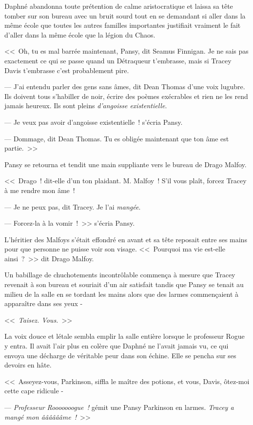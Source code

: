 Daphné abandonna toute prétention de calme aristocratique et laissa sa tête tomber sur son bureau avec un bruit sourd tout en se demandant si aller dans la même école que toutes les autres familles importantes justifiait vraiment le fait d'aller dans la même école que la légion du Chaos.

<<~Oh, tu es mal barrée maintenant, Pansy, dit Seamus Finnigan. Je ne sais pas exactement ce qui se passe quand un Détraqueur t'embrasse, mais si Tracey Davis t'embrasse c'est probablement pire.

--- J'ai entendu parler des gens sans âmes, dit Dean Thomas d'une voix lugubre. Ils doivent tous s'habiller de noir, écrire des poèmes exécrables et rien ne les rend jamais heureux. Ils sont pleins \emph{d'angoisse existentielle}.

--- Je veux pas avoir d'angoisse existentielle~! s'écria Pansy.

--- Dommage, dit Dean Thomas. Tu es obligée maintenant que ton âme est partie.~>>

Pansy se retourna et tendit une main suppliante vers le bureau de Drago Malfoy.

<<~Drago~! dit-elle d'un ton plaidant. M. Malfoy~! S'il vous plaît, forcez Tracey à me rendre mon âme~!

--- Je ne peux pas, dit Tracey. Je l'ai \emph{mangée}.

--- Forcez-la à la vomir~!~>> s'écria Pansy.

L'héritier des Malfoys s'était effondré en avant et sa tête reposait entre ses mains pour que personne ne puisse voir son visage. <<~Pourquoi ma vie est-elle ainsi~?~>> dit Drago Malfoy.

Un babillage de chuchotements incontrôlable commença à mesure que Tracey revenait à son bureau et souriait d'un air satisfait tandis que Pansy se tenait au milieu de la salle en se tordant les mains alors que des larmes commençaient à apparaître dans ses yeux -

<<~\emph{Taisez. Vous.}~>>

La voix douce et létale sembla emplir la salle entière lorsque le professeur Rogue y entra. Il avait l'air plus en colère que Daphné ne l'avait jamais vu, ce qui envoya une décharge de véritable peur dans son échine. Elle se pencha sur ses devoirs en hâte.

<<~Asseyez-vous, Parkinson, siffla le maître des potions, et vous, Davis, ôtez-moi cette cape ridicule -

--- \emph{Professeur Rooooooogue~!} gémit une Pansy Parkinson en larmes. \emph{Tracey a mangé mon ââââââme~!}~>>

